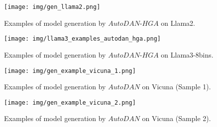 \begin{figure*}[H]
    \centering
    \texttt{[image: img/gen\_llama2.png]}
    \caption{Examples of model generation by $AutoDAN\text{-}HGA$ on Llama2.}
    \label{fig:llama2-autodan-hga}
\end{figure*}

\begin{figure*}[H]
    \centering
    \texttt{[image: img/llama3\_examples\_autodan\_hga.png]}
    \caption{Examples of model generation by $AutoDAN\text{-}HGA$ on Llama3-8bins.}
    \label{fig:llama3-autodan-hga}
\end{figure*}

\begin{figure*}[H]
    \centering
    \texttt{[image: img/gen\_example\_vicuna\_1.png]}
    \caption{Examples of model generation by $AutoDAN$ on Vicuna (Sample 1).}
    \label{fig:vicuna-autodan-1}
\end{figure*}

\begin{figure*}[H]
    \centering
    \texttt{[image: img/gen\_example\_vicuna\_2.png]}
    \caption{Examples of model generation by $AutoDAN$ on Vicuna (Sample 2).}
    \label{fig:vicuna-autodan-2}
\end{figure*}
